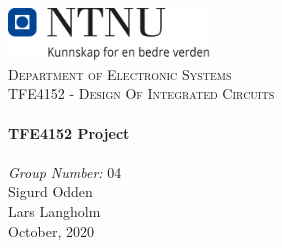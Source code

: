 
\begin{titlepage}
\vbox{ }

\vbox{ }

\begin{center}
\includegraphics[width=0.40\textwidth]{Images/NTNU_logo.png}\\[1cm]
\textsc{\LARGE Department of Electronic Systems}\\[1.5cm]
\textsc{\Large TFE4152  - Design Of Integrated Circuits}\\[0.5cm]

\vbox{ }
\HRule \\[0.4cm]
{ \huge \bfseries TFE4152 Project}\\[0.4cm]
\HRule \\[1.5cm]
\large
\emph{Group Number:} 04 \\

\vspace{2em}
Sigurd Odden \\
Lars Langholm \\

\vfill
{\large October, 2020}
\end{center}
\end{titlepage}